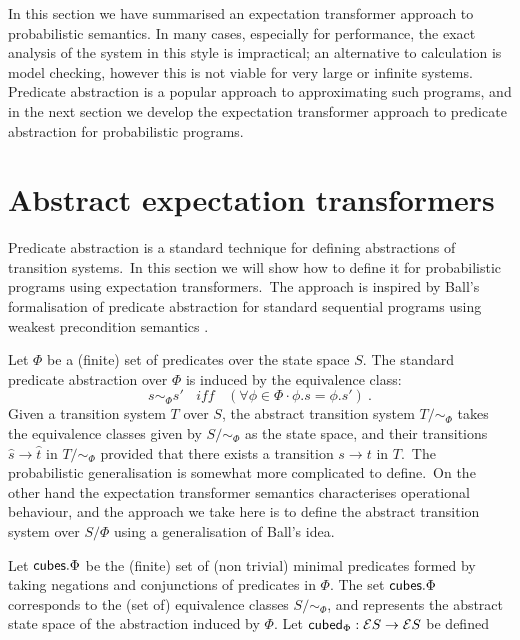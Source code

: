 \documentclass[numbers,copyright,creativecommons]{eptcs}
\newcommand{\EE}[1]{ {\cal E}{#1}}
\newcommand{\cubes}{\mbox{\sf cubes}}
\newcommand{\cubed}{\mbox{\sf cubed}}
\newcommand{\Wide}[1]{~~~#1~~~}
\begin{document}
In this section we have summarised an expectation transformer approach to probabilistic semantics. In many cases, especially for performance, the exact analysis of the system in this style is impractical; an alternative to calculation is model checking, however this is not viable for very large or infinite systems. Predicate abstraction is a popular approach to approximating such programs, and in the next section we develop the expectation transformer approach to predicate abstraction for probabilistic programs.


\section{Abstract expectation transformers}\label{AET}

Predicate abstraction is a standard technique for defining abstractions of transition systems.\ In this section we will show how to define it for probabilistic programs using expectation transformers.\ The approach is inspired by Ball's formalisation of predicate abstraction for standard sequential programs  using weakest precondition semantics \cite{Ball}.

Let $\Phi$ be a (finite) set of predicates over the state space $S$. The standard predicate abstraction over $\Phi$ is induced by the equivalence class:
\[
s \sim_\Phi s' ~\Wide{\textit{iff}} ~ (\forall \phi\in \Phi \cdot \phi.s = \phi.s')~.
\]
Given a transition system $T$ over $S$, the abstract transition system $T/\!\!\sim_\Phi$ takes the equivalence classes given by $S/\!\sim_\Phi$ as the state space, and their transitions $\hat{s} \rightarrow \hat{t}$ in $T/\!\sim_\Phi$ provided that there exists a transition $s \rightarrow t$ in $T$.\ The probabilistic generalisation is somewhat more complicated to define.\ On the other hand the expectation transformer semantics characterises operational behaviour, and the approach we take here is to define the abstract transition system over $S/\Phi$ using a generalisation of Ball's idea.

Let $\cubes.\Phi$ be the (finite) set of (non trivial) minimal predicates formed by taking negations and conjunctions of predicates in $\Phi$. The set $\cubes.\Phi$ corresponds to the (set of) equivalence classes $S/\!\!\sim_\Phi$, and represents the abstract state space of the abstraction induced by $\Phi$.
Let $\cubed_\Phi : \EE S \rightarrow \EE S$ be defined
\end{document}
